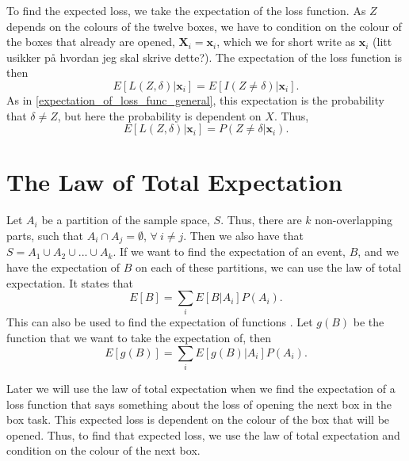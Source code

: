 To find the expected loss, we take the expectation of the loss function. As $Z$ depends on the colours of the twelve boxes, we have to condition on the colour of the boxes that already are opened, $ \textbf{X}_i=\textbf{x}_i$, which we for short write as $\textbf{x}_i$ (litt usikker på hvordan jeg skal skrive dette?). The expectation of the loss function is then
\begin{equation*}
    E[L(Z,\delta)|\textbf{x}_i] = E[I(Z\neq \delta)|\textbf{x}_i].
\end{equation*}
As in \eqref{expectation_of_loss_func_general}, this expectation is the probability that $\delta \neq Z$, but here the probability is dependent on $X$. Thus,
\begin{equation}
\label{exp_loss_theory}
    E[L(Z,\delta)|\textbf{x}_i] = P(Z\neq \delta|\textbf{x}_i).
\end{equation}








\section{The Law of Total Expectation}
Let $A_i$ be a partition of the sample space, $S$. Thus, there are $k$ non-overlapping parts, such that $A_i \cap A_j = \emptyset$, $\forall \:
i \neq j$. Then we also have that $S = A_1 \cup A_2 \cup...\cup A_k$. If we want to find the expectation of an event, $B$, and we have the expectation of $B$ on each of these partitions, we can use the law of total expectation. It states that
\begin{equation}
    E[B] = \sum_i E[B|A_i]P(A_i).
\end{equation}
This can also be used to find the expectation of functions \citep{schay2016introduction}. Let $g(B)$ be the function that we want to take the expectation of, then
\begin{equation}
\label{law_tot_exp_func}
    E[g(B)] = \sum_i E[g(B)|A_i]P(A_i).
\end{equation}

Later we will use the law of total expectation when we find the expectation of a loss function that says something about the loss of opening the next box in the box task. This expected loss is dependent on the colour of the box that will be opened. Thus, to find that expected loss, we use the law of total expectation and condition on the colour of the next box. 

